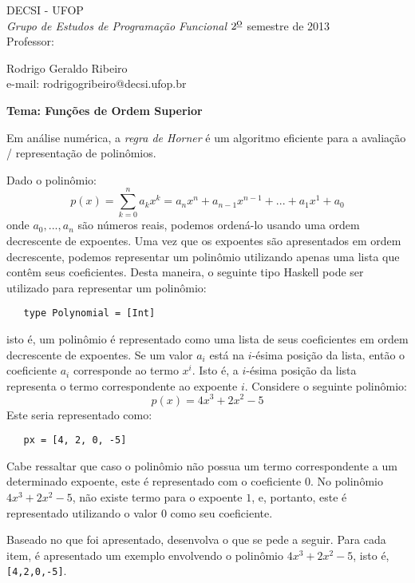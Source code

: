 \documentclass[10pt,a4paper]{report}
\begin{document}
 
 \hfill DECSI - UFOP \\
{\it Grupo de Estudos de Programa\c{c}\~ao Funcional}
 \hfill $\mbox{2}^{\mbox{\underline{o}}}$ semestre de 2013 \\
Professor: \parbox[t]{14cm}{Rodrigo Geraldo Ribeiro \\
                     e-mail: rodrigogribeiro@decsi.ufop.br}
 
 \hfill {\bf Tema: Fun\c{c}\~oes de Ordem Superior}

\hfill

Em an\'alise num\'erica, a \emph{regra de Horner} \'e um algoritmo eficiente para a avalia\c{c}\~ao / 
representa\c{c}\~ao de polin\^omios.

Dado o polin\^omio:
\begin{equation*}
   p(x) = \sum_{k=0}^{n}a_{k}x^{k} = a_{n}x^{n} + a_{n - 1}x^{n - 1} + ... + a_{1}x^{1} + a_{0}
\end{equation*}
onde $a_{0}, ..., a_{n}$ s\~ao n\'umeros reais, podemos orden\'a-lo usando uma
ordem decrescente de expoentes. Uma vez que os expoentes s\~ao apresentados em ordem decrescente, podemos representar
um polin\^omio utilizando apenas uma lista que cont\^em seus coeficientes. Desta maneira, o seguinte tipo Haskell pode
ser utilizado para representar um polin\^omio:

\begin{verbatim}
   type Polynomial = [Int]
\end{verbatim}
isto \'e, um polin\^omio \'e representado como uma lista de seus coeficientes em ordem decrescente de expoentes.
Se um valor $a_{i}$ est\'a na $i$-\'esima
posi\c{c}\~ao da lista, ent\~ao o coeficiente $a_{i}$ corresponde ao termo $x^{i}$. Isto \'e, a $i$-\'esima 
posi\c{c}\~ao da lista representa o termo correspondente ao expoente $i$. Considere o seguinte polin\^omio:
\begin{equation*}
   p(x) = 4x^{3} + 2x^{2} - 5
\end{equation*}
Este seria representado como:
\begin{verbatim}
   px = [4, 2, 0, -5]
\end{verbatim}
Cabe ressaltar que caso o polin\^omio n\~ao possua um termo correspondente a um determinado expoente, este \'e
 representado com o coeficiente $0$. No polin\^omio $4x^{3}+2x^{2}-5$, n\~ao existe termo para o expoente $1$, e,
 portanto, este \'e representado utilizando o valor $0$ como seu coeficiente.
 
Baseado no que foi apresentado, desenvolva o que se pede a seguir. Para cada item, \'e apresentado um exemplo 
envolvendo o polin\^omio $4x^{3} + 2x^{2} - 5$, isto \'e, \texttt{[4,2,0,-5]}.
\end{document}
